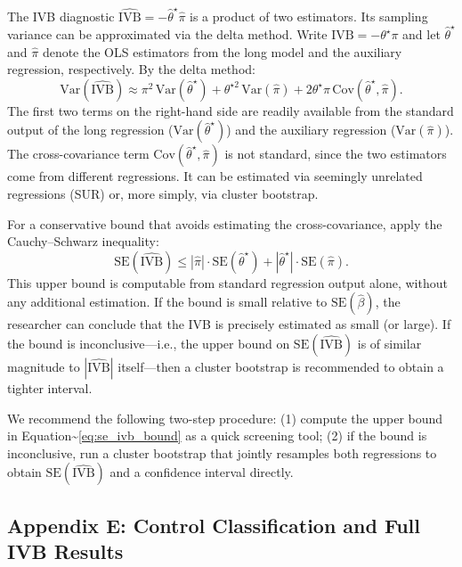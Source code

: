 \documentclass[
]{article}
\begin{document}
The IVB diagnostic
\(\widehat{\text{IVB}} = -\hat{\theta}^{\star} \hat{\pi}\) is a product
of two estimators. Its sampling variance can be approximated via the
delta method. Write \(\text{IVB} = -\theta^{\star}\pi\) and let
\(\hat{\theta}^{\star}\) and \(\hat{\pi}\) denote the OLS estimators
from the long model and the auxiliary regression, respectively. By the
delta method: \begin{equation}
\text{Var}(\widehat{\text{IVB}}) \approx \pi^2 \, \text{Var}(\hat{\theta}^{\star}) + \theta^{\star 2} \, \text{Var}(\hat{\pi}) + 2\theta^{\star}\pi \, \text{Cov}(\hat{\theta}^{\star}, \hat{\pi}).
\label{eq:var_ivb}
\end{equation} The first two terms on the right-hand side are readily
available from the standard output of the long regression
(\(\text{Var}(\hat{\theta}^{\star})\)) and the auxiliary regression
(\(\text{Var}(\hat{\pi})\)). The cross-covariance term
\(\text{Cov}(\hat{\theta}^{\star}, \hat{\pi})\) is not standard, since
the two estimators come from different regressions. It can be estimated
via seemingly unrelated regressions (SUR) or, more simply, via cluster
bootstrap.

For a conservative bound that avoids estimating the cross-covariance,
apply the Cauchy--Schwarz inequality: \begin{equation}
\text{SE}(\widehat{\text{IVB}}) \leq |\hat{\pi}| \cdot \text{SE}(\hat{\theta}^{\star}) + |\hat{\theta}^{\star}| \cdot \text{SE}(\hat{\pi}).
\label{eq:se_ivb_bound}
\end{equation} This upper bound is computable from standard regression
output alone, without any additional estimation. If the bound is small
relative to \(\text{SE}(\hat{\beta})\), the researcher can conclude that
the IVB is precisely estimated as small (or large). If the bound is
inconclusive---i.e., the upper bound on
\(\text{SE}(\widehat{\text{IVB}})\) is of similar magnitude to
\(|\widehat{\text{IVB}}|\) itself---then a cluster bootstrap is
recommended to obtain a tighter interval.

We recommend the following two-step procedure: (1) compute the upper
bound in Equation\textasciitilde{}\eqref{eq:se_ivb_bound} as a quick
screening tool; (2) if the bound is inconclusive, run a cluster
bootstrap that jointly resamples both regressions to obtain
\(\text{SE}(\widehat{\text{IVB}})\) and a confidence interval directly.

\subsection{\texorpdfstring{Appendix E: Control Classification and Full
IVB Results
\label{app:classification}}{Appendix E: Control Classification and Full IVB Results }}\label{appendix-e-control-classification-and-full-ivb-results}
\end{document}
